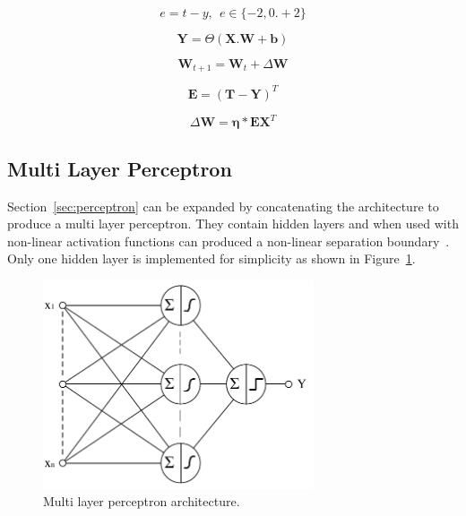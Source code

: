 \documentclass{ecsarticle}     %
\begin{document}
\begin{equation}	
	e = t - y,\:\:e \in \{-2,0.+2\}
	\label{eqn:slp_error}
\end{equation}

\begin{equation}
   \textbf{Y} = \Theta ( \textbf{X}.\textbf{W} + \textbf{b})
   \label{eqn:slp_mat}
\end{equation}

\begin{equation}	
	\textbf{W}_{t+1} = \textbf{W}_t + \Delta \textbf{W}
	\label{eqn:slp_learn_1}
\end{equation}

\begin{equation}	
	\mathbf{E} = (\mathbf{T} - \mathbf{Y})^{T}
	\label{eqn:slp_learn_2}
\end{equation}

\begin{equation}	
	\Delta \mathbf{W} = \mathbf{\eta}*\mathbf{E}\mathbf{X}^T
	\label{eqn:slp_learn_3}
\end{equation}


\subsection{Multi Layer Perceptron}
Section~\ref{sec:perceptron} can be expanded by concatenating the architecture to produce a multi layer perceptron.
They contain hidden layers and when used with non-linear activation functions can produced a non-linear separation boundary~\citep{bennett01ml}.
Only one hidden layer is implemented for simplicity as shown in Figure~\ref{fig:mlp}. 


\begin{figure}[ht]
   \centering
    \includegraphics[width = 8cm]{MLP.pdf}
   \caption{Multi layer perceptron architecture.}
   \label{fig:mlp}
\end{figure}
\end{document}
